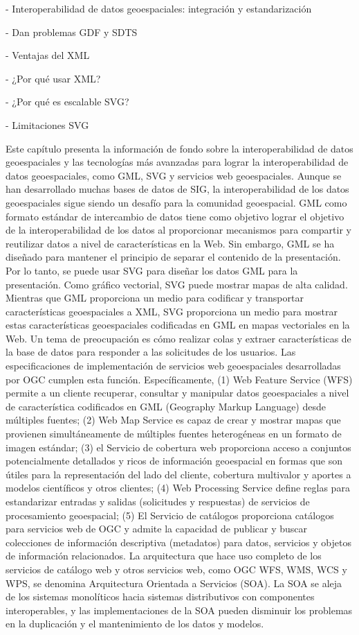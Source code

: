 - Interoperabilidad de datos geoespaciales: integración y estandarización

- Dan problemas GDF y SDTS

- Ventajas del XML

- ¿Por qué usar XML?

- ¿Por qué es escalable SVG?

- Limitaciones SVG

Este capítulo presenta la información de fondo sobre la interoperabilidad de datos geoespaciales y las tecnologías más avanzadas para lograr la interoperabilidad de datos geoespaciales, como GML, SVG y servicios web geoespaciales. Aunque se han desarrollado muchas bases de datos de SIG, la interoperabilidad de los datos geoespaciales sigue siendo un desafío para la comunidad geoespacial. GML como formato estándar de intercambio de datos tiene como objetivo lograr el objetivo de la interoperabilidad de los datos al proporcionar mecanismos para compartir y reutilizar datos a nivel de características en la Web. Sin embargo, GML se ha diseñado para mantener el principio de separar el contenido de la presentación. Por lo tanto, se puede usar SVG para diseñar los datos GML para la presentación. Como gráfico vectorial, SVG puede mostrar mapas de alta calidad. Mientras que GML proporciona un medio para codificar y transportar características geoespaciales a XML, SVG proporciona un medio para mostrar estas características geoespaciales codificadas en GML en mapas vectoriales en la Web. Un tema de preocupación es cómo realizar colas y extraer características de la base de datos para responder a las solicitudes de los usuarios. Las especificaciones de implementación de servicios web geoespaciales desarrolladas por OGC cumplen esta función. Específicamente, (1) Web Feature Service (WFS) permite a un cliente recuperar, consultar y manipular datos geoespaciales a nivel de característica codificados en GML (Geography Markup Language) desde múltiples fuentes; (2) Web Map Service es capaz de crear y mostrar mapas que provienen simultáneamente de múltiples fuentes heterogéneas en un formato de imagen estándar; (3) el Servicio de cobertura web proporciona acceso a conjuntos potencialmente detallados y ricos de información geoespacial en formas que son útiles para la representación del lado del cliente, cobertura multivalor y aportes a modelos científicos y otros clientes; (4) Web Processing Service define reglas para estandarizar entradas y salidas (solicitudes y respuestas) de servicios de procesamiento geoespacial; (5) El Servicio de catálogos proporciona catálogos para servicios web de OGC y admite la capacidad de publicar y buscar colecciones de información descriptiva (metadatos) para datos, servicios y objetos de información relacionados. La arquitectura que hace uso completo de los servicios de catálogo web y otros servicios web, como OGC WFS, WMS, WCS y WPS, se denomina Arquitectura Orientada a Servicios (SOA). La SOA se aleja de los sistemas monolíticos hacia sistemas distributivos con componentes interoperables, y las implementaciones de la SOA pueden disminuir los problemas en la duplicación y el mantenimiento de los datos y modelos.











